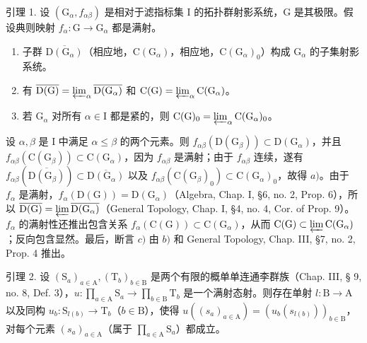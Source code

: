 
引理 1. 设 \((\mathrm{G}_{\alpha}, f_{\alpha \beta})\) 是相对于滤指标集 I 的拓扑群射影系统，G 是其极限。假设典则映射 \(f_{\alpha}: \mathrm{G} \to \mathrm{G}_{\alpha}\) 都是满射。

\begin{enumerate}
\def\labelenumi{\alph{enumi})}
\item
  子群 \(\overline{\mathrm{D}(\mathrm{G}_{\alpha})}\)（相应地，\(\mathrm{C}(\mathrm{G}_{\alpha})\)，相应地，\(\mathrm{C}(\mathrm{G}_{\alpha})_0\)）构成 \(\mathrm{G}_{\alpha}\) 的子集射影系统。
\item
  有 \(\overline{\mathrm{D}(\mathrm{G})}=\varprojlim_{\alpha}\overline{\mathrm{D}(\mathrm{G}_{\alpha})}\) 和 \(\mathrm{C}(\mathrm{G})=\varprojlim_{\alpha}\mathrm{C}(\mathrm{G}_{\alpha})\)。
\item
  若 \(\mathrm{G}_{\alpha}\) 对所有 \(\alpha \in \mathrm{I}\) 都是紧的，则 \(\mathrm{C}(\mathrm{G})_0 = \varprojlim_{\alpha} \mathrm{C}(\mathrm{G}_{\alpha})_0\)。
\end{enumerate}

设 \(\alpha, \beta\) 是 I 中满足 \(\alpha \leq \beta\) 的两个元素。则 \(f_{\alpha \beta}(\mathrm{D}(\mathrm{G}_{\beta})) \subset \mathrm{D}(\mathrm{G}_{\alpha})\)，并且 \(f_{\alpha \beta}(\mathrm{C}(\mathrm{G}_{\beta})) \subset \mathrm{C}(\mathrm{G}_{\alpha})\)，因为 \(f_{\alpha \beta}\) 是满射；由于 \(f_{\alpha \beta}\) 连续，遂有 \(f_{\alpha \beta}(\overline{\mathrm{D}(\mathrm{G}_{\beta})}) \subset \overline{\mathrm{D}(\mathrm{G}_{\alpha})}\) 以及 \(f_{\alpha \beta}(\mathrm{C}(\mathrm{G}_{\beta})_0) \subset \mathrm{C}(\mathrm{G}_{\alpha})_0\)，故得 \(a)\)。由于 \(f_{\alpha}\) 是满射，\(f_{\alpha}(\mathrm{D}(\mathrm{G})) = \mathrm{D}(\mathrm{G}_{\alpha})\)（Algebra, Chap. I, §6, no. 2, Prop. 6），所以 \(\overline{\mathrm{D}(\mathrm{G})} = \varprojlim \overline{\mathrm{D}(\mathrm{G}_{\alpha})}\)（General Topology, Chap. I, §4, no. 4, Cor. of Prop. 9）。\(f_{\alpha}\) 的满射性还推出包含关系 \(f_{\alpha}(\mathrm{C}(\mathrm{G})) \subset \mathrm{C}(\mathrm{G}_{\alpha})\)，从而 \(\mathrm{C}(\mathrm{G}) \subset \varprojlim \mathrm{C}(\mathrm{G}_{\alpha})\)；反向包含显然。最后，断言 \(c)\) 由 \(b)\) 和 General Topology, Chap. III, §7, no. 2, Prop. 4 推出。

引理 2. 设 \((\mathrm{S}_a)_{a\in \mathrm{A}},(\mathrm{T}_b)_{b\in \mathrm{B}}\) 是两个有限的概单单连通李群族（Chap. III, § 9, no. 8, Def. 3），\(u:\prod_{a\in \mathrm{A}}\mathrm{S}_a\to \prod_{b\in \mathrm{B}}\mathrm{T}_b\) 是一个满射态射。则存在单射 \(l: \mathrm{B} \to \mathrm{A}\) 以及同构 \(u_b: \mathrm{S}_{l(b)} \to \mathrm{T}_b\)（\(b \in \mathrm{B}\)），使得 \(u((s_a)_{a \in \mathrm{A}}) = (u_b(s_{l(b)}))_{b \in \mathrm{B}}\)，对每个元素 \((s_a)_{a \in \mathrm{A}}\)（属于 \(\prod_{a \in \mathrm{A}} \mathrm{S}_a\)）都成立。

